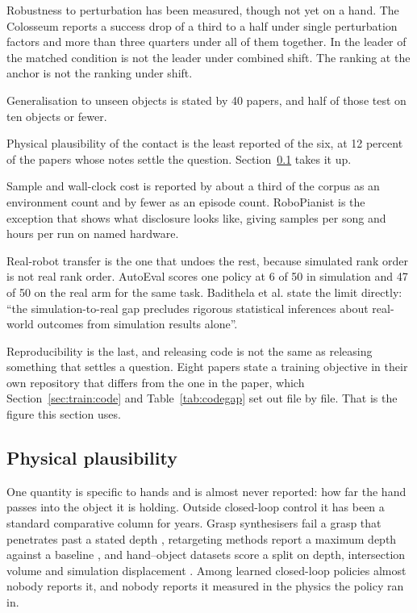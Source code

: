 Robustness to perturbation has been measured, though not yet on a hand. The Colosseum
\cite{colosseum_2024} reports a success drop of a third to a half under single perturbation
factors and more than three quarters under all of them together. In \cite{bench2dex_2026} the
leader of the matched condition is not the leader under combined shift. The ranking at the anchor
is not the ranking under shift.

Generalisation to unseen objects is stated by 40 papers, and half of those test on ten objects or
fewer.

Physical plausibility of the contact is the least reported of the six, at 12 percent of the papers
whose notes settle the question. Section~\ref{subsec:plausibility} takes it up.

Sample and wall-clock cost is reported by about a third of the corpus as an environment count and
by fewer as an episode count. RoboPianist \cite{robopianist_2023} is the exception that shows what
disclosure looks like, giving samples per song and hours per run on named hardware.

Real-robot transfer is the one that undoes the rest, because simulated rank order is not real rank
order. AutoEval \cite{autoeval_2025} scores one policy at 6 of 50 in simulation and 47 of 50 on
the real arm for the same task. Badithela et al. \cite{suresim_2025} state the limit directly:
``the simulation-to-real gap precludes rigorous statistical inferences about real-world outcomes
from simulation results alone''.

Reproducibility is the last, and releasing code is not the same as releasing something that
settles a question. Eight papers state a training objective in their own repository that differs
from the one in the paper, which Section~\ref{sec:train:code} and Table~\ref{tab:codegap} set out
file by file. That is the figure this section uses.

\subsection{Physical plausibility}
\label{subsec:plausibility}

One quantity is specific to hands and is almost never reported: how far the hand passes into the
object it is holding. Outside closed-loop control it has been a standard comparative column for
years. Grasp synthesisers fail a grasp that penetrates past a stated depth
\cite{bimangrasp_2024}, retargeting methods report a maximum depth against a baseline
\cite{toporetarget_2026}, and hand--object datasets score a split on depth, intersection volume
and simulation displacement \cite{oakink_2022}. Among learned closed-loop policies almost nobody
reports it, and nobody reports it measured in the physics the policy ran in.


